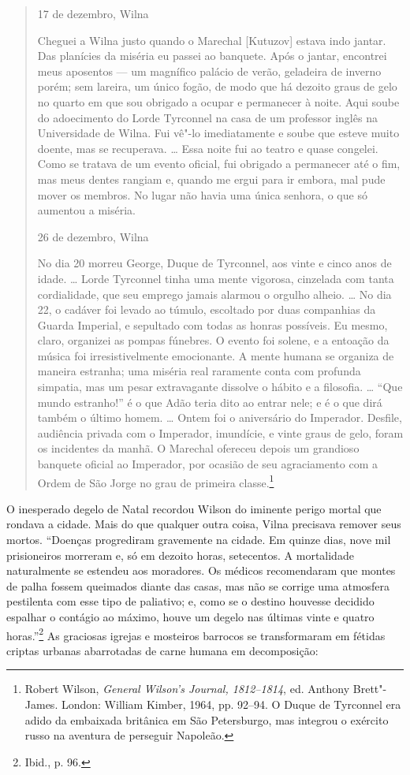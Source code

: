 \begin{quote}
17 de dezembro, Wilna

Cheguei a Wilna justo quando o Marechal {[}Kutuzov{]} estava indo
jantar. Das planícies da miséria eu passei ao banquete. Após o jantar,
encontrei meus aposentos --- um magnífico palácio de verão, geladeira de
inverno porém; sem lareira, um único fogão, de modo que há dezoito graus
de gelo no quarto em que sou obrigado a ocupar e permanecer à noite.
Aqui soube do adoecimento do Lorde Tyrconnel na casa de um professor
inglês na Universidade de Wilna. Fui vê"-lo imediatamente e soube que
esteve muito doente, mas se recuperava. \ldots{} Essa noite fui ao
teatro e quase congelei. Como se tratava de um evento oficial, fui
obrigado a permanecer até o fim, mas meus dentes rangiam e, quando me
ergui para ir embora, mal pude mover os membros. No lugar não havia uma
única senhora, o que só aumentou a miséria.

26 de dezembro, Wilna

No dia 20 morreu George, Duque de Tyrconnel, aos vinte e cinco anos de
idade. \ldots{} Lorde Tyrconnel tinha uma mente vigorosa, cinzelada com
tanta cordialidade, que seu emprego jamais alarmou o orgulho alheio.
\ldots{} No dia 22, o cadáver foi levado ao túmulo, escoltado por duas
companhias da Guarda Imperial, e sepultado com todas as honras
possíveis. Eu mesmo, claro, organizei as pompas fúnebres. O evento foi
solene, e a entoação da música foi irresistivelmente emocionante. A
mente humana se organiza de maneira estranha; uma miséria real raramente
conta com profunda simpatia, mas um pesar extravagante dissolve o hábito
e a filosofia. \ldots{} ``Que mundo estranho!'' é o que Adão teria dito
ao entrar nele; e é o que dirá também o último homem. \ldots{} Ontem foi
o aniversário do Imperador. Desfile, audiência privada com o Imperador,
imundície, e vinte graus de gelo, foram os incidentes da manhã. O
Marechal ofereceu depois um grandioso banquete oficial ao Imperador, por
ocasião de seu agraciamento com a Ordem de São Jorge no grau de primeira
classe.\footnote{Robert Wilson, \emph{General Wilson's Journal,
  1812--1814}, ed. Anthony Brett"-James. London: William Kimber, 1964, pp.
  92--94. O Duque de Tyrconnel era adido da embaixada britânica em São
  Petersburgo, mas integrou o exército russo na aventura de perseguir
  Napoleão.}
\end{quote}

O inesperado degelo de Natal recordou Wilson do iminente perigo mortal
que rondava a cidade. Mais do que qualquer outra coisa, Vilna precisava
remover seus mortos. ``Doenças progrediram gravemente na cidade. Em
quinze dias, nove mil prisioneiros morreram e, só em dezoito horas,
setecentos. A mortalidade naturalmente se estendeu aos moradores. Os
médicos recomendaram que montes de palha fossem queimados diante das
casas, mas não se corrige uma atmosfera pestilenta com esse tipo de
paliativo; e, como se o destino houvesse decidido espalhar o contágio ao
máximo, houve um degelo nas últimas vinte e quatro horas.''\footnote{Ibid.,
  p. 96.} As graciosas igrejas e mosteiros barrocos se transformaram em
fétidas criptas urbanas abarrotadas de carne humana em decomposição:

